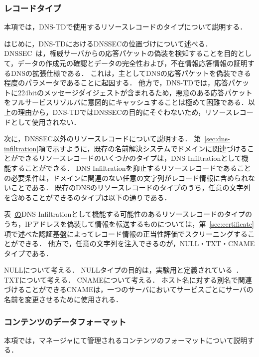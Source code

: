 \subsubsection{レコードタイプ}
本項では，DNS-TDで使用するリソースレコードのタイプについて説明する．

はじめに，DNS-TDにおけるDNSSECの位置づけについて述べる．
DNSSEC~\cite{rfc4033}は，権威サーバからの応答パケットの偽装を検知することを目的として，データの作成元の確認とデータの完全性および，不在情報応答情報の証明するDNSの拡張仕様である．
これは，主としてDNSの応答パケットを偽装できる程度のパラメータであることに起因する．
他方で，DNS-TDでは，応答パケットに224bitのメッセージダイジェストが含まれるため，悪意のある応答パケットをフルサービスリゾルバに意図的にキャッシュすることは極めて困難である．以上の理由から，DNS-TDではDNSSECの目的にそぐわないため，リソースレコードとして使用されない．

次に，DNSSEC以外のリソースレコードについて説明する．
第~\ref{sec:dns-infiltration}項で示すように，既存の名前解決システムでドメインに関連づけることができるリソースレコードのいくつかのタイプは，DNS Infiltrationとして機能することができる．
DNS Infiltrationを抑止するリソースレコードであることの必要条件は，ドメインに関連のない任意の文字列がレコード情報に含められないことである．
既存のDNSのリソースレコードのタイプのうち，任意の文字列を含めることができるのタイプは以下の通りである．


表~\href{tab:infil-rtype}のDNS Infiltrationとして機能する可能性のあるリソースレコードのタイプのうち，IPアドレスを偽装して情報を転送するものについては，第~\ref{sec:certificate}項で述べた認証基盤によってレコード情報の正当性評価でスクリーニングすることができる．
他方で，任意の文字列を注入できるのが，NULL・TXT・CNAMEタイプである．

NULLについて考える．
NULLタイプの目的は，実験用と定義されている~\cite{rfc1035}．
TXTについて考える．
CNAMEについて考える．
ホスト名に対する別名で関連づけることができるCNAMEは，一つのサーバにおいてサービスごとにサーバの名前を変更させるために使用される．


\subsubsection{コンテンツのデータフォーマット}
本項では，マネージャにて管理されるコンテンツのフォーマットについて説明する．

